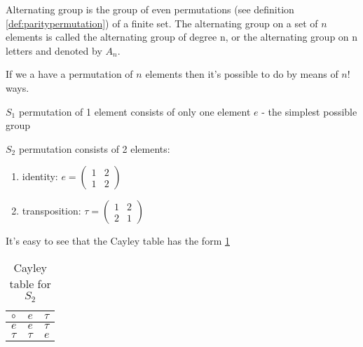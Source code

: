 \begin{appendices}
\begin{definition}
  Alternating group \cite{wiki:alteringgroup} is the group of even
  permutations (see definition \ref{def:paritypermutation}) of a finite 
  set. The alternating group on a set of $n$ elements is called the
  alternating group of degree n, or the alternating group on n letters
  and denoted by $A_n$.
  \label{def:alternatinggroup}
\end{definition}

\begin{example}[$S_n$ group]
  If we a have a permutation of $n$ elements then it's possible to do
  by means of $n!$ ways.
  \label{ex:sngroup}
\end{example}

\begin{example}[$S_1$ group]
  $S_1$ permutation of 1 element consists of only one element $e$ -
  the simplest possible group
  \label{ex:s1group}
\end{example}

\begin{example}[$S_2$ group]
  $S_2$ permutation consists of 2 elements:
  \begin{enumerate}
  \item identity:
    \(
    e = \begin{pmatrix}
      1 & 2 \\
      1 & 2
    \end{pmatrix}
    \) 
  \item transposition:
    \(
    \tau = \begin{pmatrix}
      1 & 2 \\
      2 & 1
    \end{pmatrix}
    \) 
  \end{enumerate}
  It's easy to see that the Cayley table has the form \ref{tab:CayleyS2}
    \begin{table}
    \centering
    \caption{Cayley table for $S_2$}
    \label{tab:CayleyS2}
    \begin{tabular}{l|ll}
      \toprule
      $\circ$ & $e$ & $\tau$ \\
      \midrule
      $e$ & $e$ & $\tau$ \\
      $\tau$ & $\tau$ & $e$ \\
      \bottomrule
    \end{tabular}
    \end{table}
  \label{ex:s2group}
\end{example}


\end{appendices}
